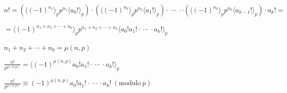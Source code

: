\documentclass{article}
\begin{document}
\( n! = (\langle{{(-1)}^{n_{1}}}\rangle_{p} p^{n_{1}}\langle{a_{0}!}\rangle_{p}) \cdot (\langle{{(-1)}^{n_{2}}}\rangle_{p} p^{n_{2}}\langle{a_{1}!}\rangle_{p}) \cdot\ \cdots\ \cdot \cdot (\langle{{(-1)}^{n_{k}}}\rangle_{p} p^{n_{k}}\langle{a_{k-1}!}\rangle_{p}) \cdot a_{k}! = \)

\( = \langle{{(-1)}^{n_{1}+n_{2}+ \cdots + n_{k}}}\rangle_{p} p^{n_{1}+n_{2}+\cdots +n_{k}}\langle{a_{0}!a_{1}! \cdot\ \cdots\ \cdot a_{k}!}\rangle_{p} \)

\( n_{1}+n_{2}+\cdots+n_{k} = \mu(n,p) \)

\( \frac{n!}{p^{\mu(n,p)}} = \langle{{(-1)}^{\mu(n,p)}a_{0}!a_{1}! \cdot\ \cdots\ \cdot a_{k}!}\rangle_{p} \)

\( \frac{n!}{p^{\mu(n,p)}} \equiv {(-1)}^{\mu(n,p)}a_{0}!a_{1}! \cdot\ \cdots\ \cdot a_{k}! \ (\mathrm{modulo}\ p) \)
\end{document}
